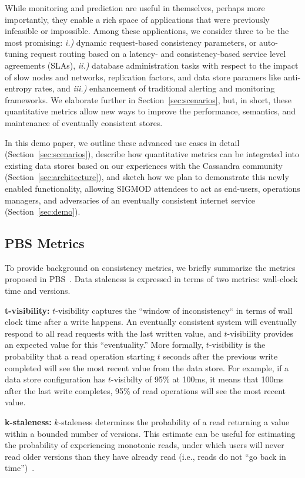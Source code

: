 While monitoring and prediction are useful in themselves, perhaps more
importantly, they enable a rich space of applications that were
previously infeasible or impossible. Among these applications, we
consider three to be the most promising: \textit{i.)} dynamic
request-based consistency parameters, or auto-tuning request routing
based on a latency- and consistency-based service level agreements
(SLAs), \textit{ii.)}  database administration tasks with respect to
the impact of slow nodes and networks, replication factors, and data
store paramers like anti-entropy rates, and \textit{iii.)} enhancement
of traditional alerting and monitoring frameworks. We elaborate
further in Section~\ref{sec:scenarios}, but, in short, these
quantitative metrics allow new ways to improve the performance,
semantics, and maintenance of eventually consistent stores.

In this demo paper, we outline these advanced use cases in detail
(Section~\ref{sec:scenarios}), describe how quantitative metrics can
be integrated into existing data stores based on our experiences with
the Cassandra community (Section~\ref{sec:architecture}), and sketch
how we plan to demonstrate this newly enabled functionality, allowing
SIGMOD attendees to act as end-users, operations managers, and
adversaries of an eventually consistent internet service
(Section~\ref{sec:demo}).

\subsection{PBS Metrics}
To provide background on consistency metrics, we briefly summarize the
metrics proposed in PBS~\cite{pbs-vldb2012}. Data
staleness is expressed in terms of two metrics: wall-clock time
and versions.

\textbf{t-visibility:} $t$-visibility captures the ``window of
inconsistency`` in terms of wall clock time after a write happens. An
eventually consistent system will eventually respond to all read
requests with the last written value, and $t$-visibility provides an expected
value for this ``eventuality.''  More formally, $t$-visibility is the
probability that a read operation starting $t$ seconds after the
previous write completed will see the most recent value from the data
store. For example, if a data store configuration has $t$-visibilty of
95\% at 100ms, it means that 100ms after the last write completes,
95\% of read operations will see the most recent value.

\textbf{k-staleness:} $k$-staleness determines the probability of a
read returning a value within a bounded number of versions. This
estimate can be useful for estimating the probability of experiencing
monotonic reads, under which users will never read older versions than
they have already read (i.e., reads do not ``go back in
time'')~\cite{vogels-defs}.

